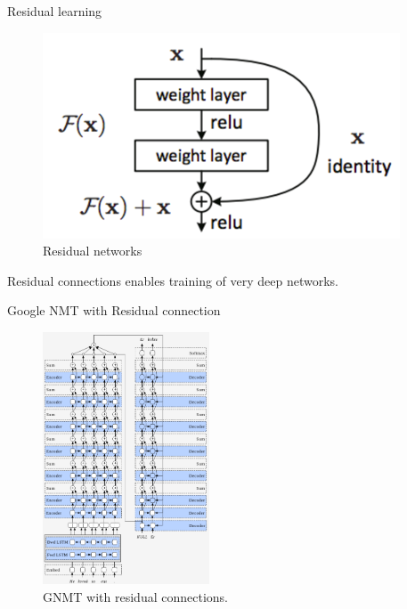 ﻿\documentclass[table,aspectratio=43,mathserif,xcolor={usenames,dvipsnames,svgnames,table},10pt]{beamer}
\begin{document}
\begin{frame}{Residual learning}
  \begin{figure}[h]
    \includegraphics[width=.9\linewidth]{images/residual.png}  
    \caption{ Residual networks}
  \end{figure}
  \vspace{-1cm}
  Residual connections enables training of very deep networks. 
\end{frame}

\begin{frame}{Google NMT with Residual connection}
 \begin{figure}[h]
    \includegraphics[height=7.5cm]{images/residual_gnmt.png}  
    \caption{ GNMT with residual connections.}
  \end{figure}
\end{frame}
\end{document}
